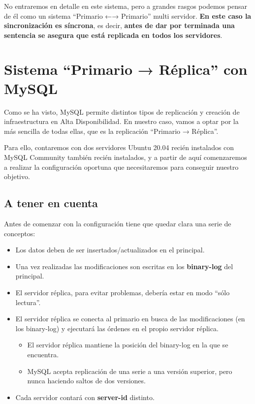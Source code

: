 No entraremos en detalle en este sistema, pero a grandes rasgos podemos pensar de él como un sistema “Primario ←→ Primario” multi servidor. \textbf{En este caso la sincronización es síncrona}, es decir, \textbf{antes de dar por terminada una sentencia se asegura que está replicada en todos los servidores}.


\section{Sistema “Primario → Réplica” con MySQL}
Como se ha visto, MySQL permite distintos tipos de replicación y creación de infraestructura en Alta Disponibilidad. En nuestro caso, vamos a optar por la más sencilla de todas ellas, que es la replicación “Primario → Réplica”.

Para ello, contaremos con dos servidores Ubuntu 20.04 recién instalados con MySQL Community también recién instalados, y a partir de aquí comenzaremos a realizar la configuración oportuna que necesitaremos para conseguir nuestro objetivo.


\subsection{A tener en cuenta}
Antes de comenzar con la configuración tiene que quedar clara una serie de conceptos:

\begin{itemize}
    \item Los datos deben de ser insertados/actualizados en el principal.
    \item Una vez realizadas las modificaciones son escritas en los \textbf{binary-log} del principal.
    \item El servidor réplica, para evitar problemas, debería estar en modo “sólo lectura”.
    \item El servidor réplica se conecta al primario en busca de las modificaciones (en los binary-log) y ejecutará las órdenes en el propio servidor réplica.
    \begin{itemize}
        \item El servidor réplica mantiene la posición del binary-log en la que se encuentra.
        \item MySQL acepta replicación de una serie a una versión superior, pero nunca haciendo saltos de dos versiones.
    \end{itemize}
    \item Cada servidor contará con \textbf{server-id} distinto.
\end{itemize}

